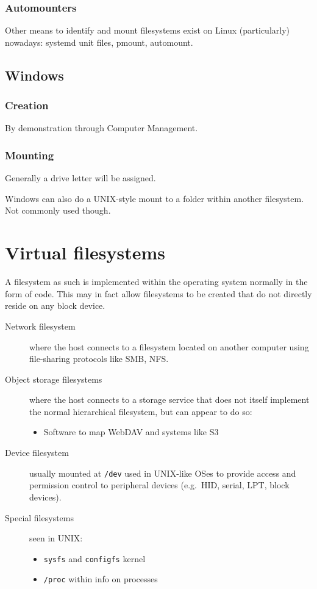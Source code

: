 \subsubsection{Automounters}\label{automounters}

Other means to identify and mount filesystems exist on Linux
(particularly) nowadays: systemd unit files, pmount, automount.

\subsection{Windows}\label{windows}

\subsubsection{Creation}\label{creation-1}

By demonstration through Computer Management.

\subsubsection{Mounting}\label{mounting-1}

Generally a drive letter will be assigned.

Windows can also do a UNIX-style mount to a folder within another
filesystem. Not commonly used though.

\section{Virtual filesystems}\label{virtual-filesystems}

A filesystem as such is implemented within the operating system normally
in the form of code. This may in fact allow filesystems to be created
that do not directly reside on any block device.

\begin{description}
\item[Network filesystem]
where the host connects to a filesystem located on another computer
using file-sharing protocols like SMB, NFS.
\item[Object storage filesystems]
where the host connects to a storage service that does not itself
implement the normal hierarchical filesystem, but can appear to do so:

\begin{itemize}

\item
  Software to map WebDAV and systems like S3
\end{itemize}
\item[Device filesystem]
usually mounted at \texttt{/dev} used in UNIX-like OSes to provide
access and permission control to peripheral devices (e.g.~HID, serial,
LPT, block devices).
\item[Special filesystems]
seen in UNIX:

\begin{itemize}
\item
  \texttt{sysfs} and \texttt{configfs} kernel
\item
  \texttt{/proc} within info on processes
\end{itemize}
\end{description}
